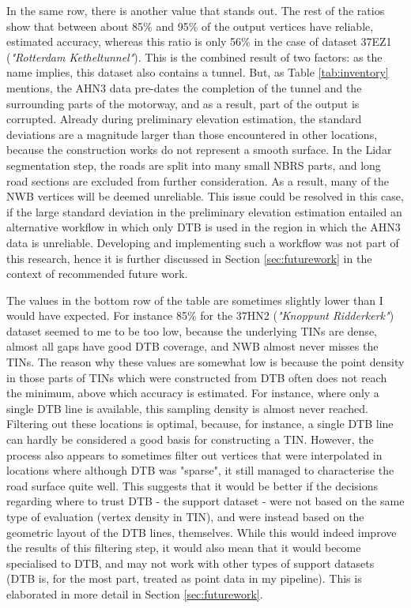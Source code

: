 In the same row, there is another value that stands out. The rest of the ratios show that between about 85\% and 95\% of the output vertices have reliable, estimated accuracy, whereas this ratio is only 56\% in the case of dataset 37EZ1 (\textit{"Rotterdam Ketheltunnel"}). This is the combined result of two factors: as the name implies, this dataset also contains a tunnel. But, as Table \ref{tab:inventory} mentions, the AHN3 data pre-dates the completion of the tunnel and the surrounding parts of the motorway, and as a result, part of the output is corrupted. Already during preliminary elevation estimation, the standard deviations are a magnitude larger than those encountered in other locations, because the construction works do not represent a smooth surface. In the Lidar segmentation step, the roads are split into many small NBRS parts, and long road sections are excluded from further consideration. As a result, many of the NWB vertices will be deemed unreliable. This issue could be resolved in this case, if the large standard deviation in the preliminary elevation estimation entailed an alternative workflow in which only DTB is used in the region in which the AHN3 data is unreliable. Developing and implementing such a workflow was not part of this research, hence it is further discussed in Section \ref{sec:futurework} in the context of recommended future work.

The values in the bottom row of the table are sometimes slightly lower than I would have expected. For instance 85\% for the 37HN2 (\textit{"Knoppunt Ridderkerk"}) dataset seemed to me to be too low, because the underlying TINs are dense, almost all gaps have good DTB coverage, and NWB almost never misses the TINs. The reason why these values are somewhat low is because the point density in those parts of TINs which were constructed from DTB often does not reach the minimum, above which accuracy is estimated. For instance, where only a single DTB line is available, this sampling density is almost never reached. Filtering out these locations is optimal, because, for instance, a single DTB line can hardly be considered a good basis for constructing a TIN. However, the process also appears to sometimes filter out vertices that were interpolated in locations where although DTB was "sparse", it still managed to characterise the road surface quite well. This suggests that it would be better if the decisions regarding where to trust DTB - the support dataset - were not based on the same type of evaluation (vertex density in TIN), and were instead based on the geometric layout of the DTB lines, themselves. While this would indeed improve the results of this filtering step, it would also mean that it would become specialised to DTB, and may not work with other types of support datasets (DTB is, for the most part, treated as point data in my pipeline). This is elaborated in more detail in Section \ref{sec:futurework}.

